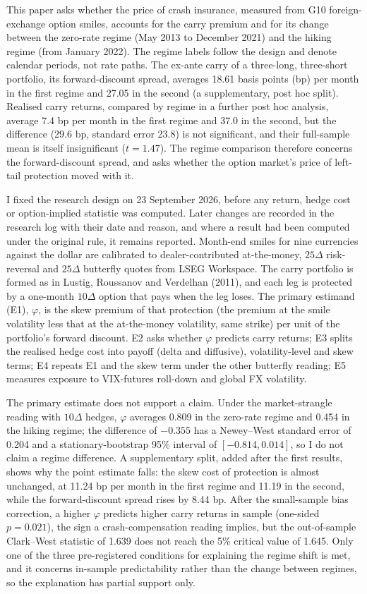 \documentclass[11pt]{article}
\theoremstyle{result}
\newcommand{\D}{\Delta}
\begin{document}
This paper asks whether the price of crash insurance, measured from G10 foreign-exchange option smiles, accounts for the carry premium and for its change between the zero-rate regime (May 2013 to December 2021) and the hiking regime (from January 2022). The regime labels follow the design and denote calendar periods, not rate paths. The ex-ante carry of a three-long, three-short portfolio, its forward-discount spread, averages 18.61 basis points (bp) per month in the first regime and 27.05 in the second (a supplementary, post hoc split). Realised carry returns, compared by regime in a further post hoc analysis, average 7.4 bp per month in the first regime and 37.0 in the second, but the difference (29.6 bp, standard error 23.8) is not significant, and their full-sample mean is itself insignificant ($t=1.47$). The regime comparison therefore concerns the forward-discount spread, and asks whether the option market's price of left-tail protection moved with it.

I fixed the research design on 23 September 2026, before any return, hedge cost or option-implied statistic was computed. Later changes are recorded in the research log with their date and reason, and where a result had been computed under the original rule, it remains reported. Month-end smiles for nine currencies against the dollar are calibrated to dealer-contributed at-the-money, $25\D$ risk-reversal and $25\D$ butterfly quotes from LSEG Workspace. The carry portfolio is formed as in Lustig, Roussanov and Verdelhan (2011), and each leg is protected by a one-month $10\D$ option that pays when the leg loses. The primary estimand (E1), $\varphi$, is the skew premium of that protection (the premium at the smile volatility less that at the at-the-money volatility, same strike) per unit of the portfolio's forward discount. E2 asks whether $\varphi$ predicts carry returns; E3 splits the realised hedge cost into payoff (delta and diffusive), volatility-level and skew terms; E4 repeats E1 and the skew term under the other butterfly reading; E5 measures exposure to VIX-futures roll-down and global FX volatility.

The primary estimate does not support a claim. Under the market-strangle reading with $10\D$ hedges, $\varphi$ averages 0.809 in the zero-rate regime and 0.454 in the hiking regime; the difference of $-0.355$ has a Newey--West standard error of 0.204 and a stationary-bootstrap 95\% interval of $[-0.814,0.014]$, so I do not claim a regime difference. A supplementary split, added after the first results, shows why the point estimate falls: the skew cost of protection is almost unchanged, at 11.24 bp per month in the first regime and 11.19 in the second, while the forward-discount spread rises by 8.44 bp. After the small-sample bias correction, a higher $\varphi$ predicts higher carry returns in sample (one-sided $p=0.021$), the sign a crash-compensation reading implies, but the out-of-sample Clark--West statistic of 1.639 does not reach the 5\% critical value of 1.645. Only one of the three pre-registered conditions for explaining the regime shift is met, and it concerns in-sample predictability rather than the change between regimes, so the explanation has partial support only.
\end{document}
